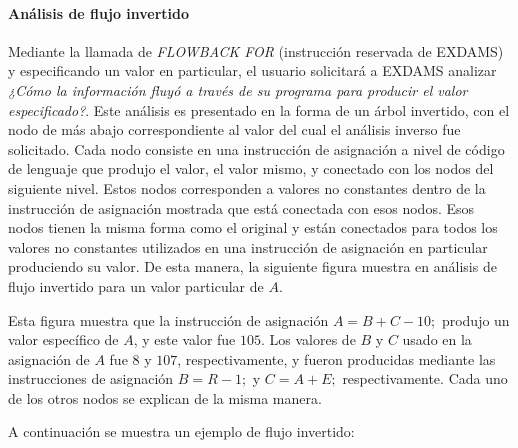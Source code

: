 \documentclass[12pt,legalpaper]{report}
\begin{document}
			\paragraph[Análisis de flujo]{Análisis de flujo invertido}

Mediante la llamada de \textit{FLOWBACK FOR} (instrucción reservada de EXDAMS) y especificando un valor en particular, el usuario solicitará a EXDAMS analizar \textit{¿Cómo la información fluyó a través de su programa para producir el valor especificado?}.  Este análisis es presentado en la forma de un árbol invertido, con el nodo de más abajo correspondiente al valor del cual el análisis inverso fue solicitado.  Cada nodo consiste en una instrucción de asignación a nivel de código de lenguaje que produjo el valor, el valor mismo, y conectado con los nodos del siguiente nivel.  Estos nodos corresponden a valores no constantes dentro de la instrucción de asignación mostrada que está conectada con esos nodos.  Esos nodos tienen la misma forma como el original y están conectados para todos los valores no constantes utilizados en una instrucción de asignación en particular produciendo su valor.  De esta manera, la siguiente figura muestra en análisis de flujo invertido para un valor particular de $A$. 

Esta figura muestra que la instrucción de asignación $A=B+C-10;$ produjo un valor específico de $A$, y este valor fue $105$.  Los valores de $B$ y $C$ usado en la asignación de $A$ fue $8$ y $107$, respectivamente, y fueron producidas mediante las instrucciones de asignación $B=R-1;$ y $C=A+E;$ respectivamente.  Cada uno de los otros nodos se explican de la misma manera.

A continuación se muestra un ejemplo de flujo invertido:
\begin{footnotesize}
\begin{center}
\end{center}
\end{footnotesize}
\end{document}
